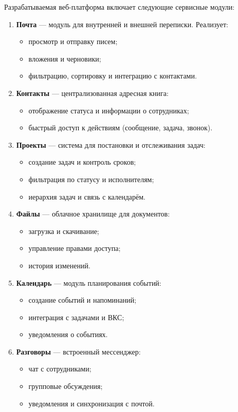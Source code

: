 Разрабатываемая веб-платформа включает следующие сервисные модули:
\begin{enumerate}
  \item \textbf{Почта} — модуль для внутренней и внешней переписки. Реализует:
  \begin{itemize}
    \item просмотр и отправку писем;
    \item вложения и черновики;
    \item фильтрацию, сортировку и интеграцию с контактами.
  \end{itemize}

  \item \textbf{Контакты} — централизованная адресная книга:
  \begin{itemize}
    \item отображение статуса и информации о сотрудниках;
    \item быстрый доступ к действиям (сообщение, задача, звонок).
  \end{itemize}

  \item \textbf{Проекты} — система для постановки и отслеживания задач:
  \begin{itemize}
    \item создание задач и контроль сроков;
    \item фильтрация по статусу и исполнителям;
    \item иерархия задач и связь с календарём.
  \end{itemize}

  \item \textbf{Файлы} — облачное хранилище для документов:
  \begin{itemize}
    \item загрузка и скачивание;
    \item управление правами доступа;
    \item история изменений.
  \end{itemize}

  \item \textbf{Календарь} — модуль планирования событий:
  \begin{itemize}
    \item создание событий и напоминаний;
    \item интеграция с задачами и ВКС;
    \item уведомления о событиях.
  \end{itemize}

  \item \textbf{Разговоры} — встроенный мессенджер:
  \begin{itemize}
    \item чат с сотрудниками;
    \item групповые обсуждения;
    \item уведомления и синхронизация с почтой.
  \end{itemize}


\end{enumerate}
